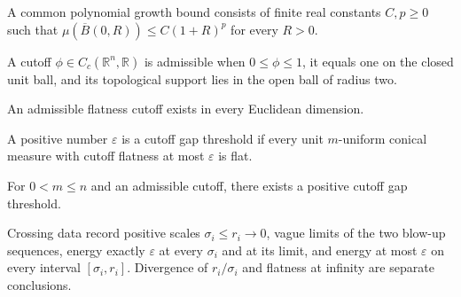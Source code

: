 \begin{definition}
\label{def:polynomial-growth-bound}
A common polynomial growth bound consists of finite real constants $C,p\geq0$ such that $\mu(\overline B(0,R))\leq C(1+R)^p$ for every $R>0$.
\end{definition}

\begin{definition}
\label{def:flatness-cutoff}
A cutoff $\phi\in C_c(\mathbb R^n,\mathbb R)$ is admissible when $0\leq\phi\leq1$, it equals one on the closed unit ball, and its topological support lies in the open ball of radius two.
\end{definition}

\begin{lemma}
\label{lem:flatness-cutoff-exists}
An admissible flatness cutoff exists in every Euclidean dimension.
\end{lemma}

\begin{definition}
\label{def:flatness-gap}
A positive number $\varepsilon$ is a cutoff gap threshold if every unit $m$-uniform conical measure with cutoff flatness at most $\varepsilon$ is flat.
\end{definition}

\begin{lemma}
\label{lem:flatness-gap-cutoff}
For $0<m\leq n$ and an admissible cutoff, there exists a positive cutoff gap threshold.
\end{lemma}

\begin{definition}
\label{def:first-crossing-data}
Crossing data record positive scales $\sigma_i\leq r_i\to0$, vague limits of the two blow-up sequences, energy exactly $\varepsilon$ at every $\sigma_i$ and at its limit, and energy at most $\varepsilon$ on every interval $[\sigma_i,r_i]$. Divergence of $r_i/\sigma_i$ and flatness at infinity are separate conclusions.
\end{definition}

